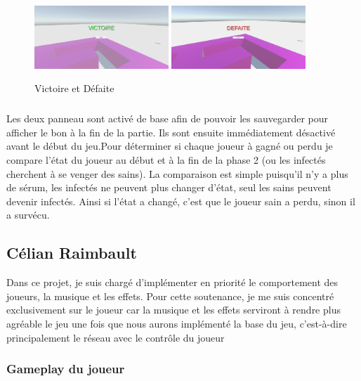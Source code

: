 \documentclass{article}
\begin{document}
\par\vspace{0.5cm}
\begin{figure}[!h]
    \centering
    \includegraphics[width=0.45\textwidth]{Victoire.PNG}
    \includegraphics[width=0.45\textwidth]{Defaite.PNG}
    \caption{Victoire et Défaite}
    \label{Ecran de fin}
\end{figure}{}

\subparagraph{}
Les deux panneau sont activé de base afin de pouvoir les sauvegarder pour afficher le bon à la fin de la partie. Ils sont ensuite immédiatement désactivé avant le début du jeu.Pour déterminer si chaque joueur à gagné ou perdu je compare l'état du joueur au début et à la fin de la phase 2 (ou les infectés cherchent à se venger des sains). La comparaison est simple puisqu'il n'y a plus de sérum, les infectés ne peuvent plus changer d'état, seul les sains peuvent devenir infectés. Ainsi si l'état a changé, c'est que le joueur sain a perdu, sinon il a survécu.

\newpage
\subsection{Célian Raimbault}

Dans ce projet, je suis chargé d'implémenter en priorité le comportement des joueurs, la musique et les effets. Pour cette soutenance, je me suis concentré exclusivement sur le joueur car la musique et les effets serviront à rendre plus agréable le jeu une fois que nous aurons implémenté la base du jeu, c'est-à-dire principalement le réseau avec le contrôle du joueur

\subsubsection{Gameplay du joueur}
\end{document}

